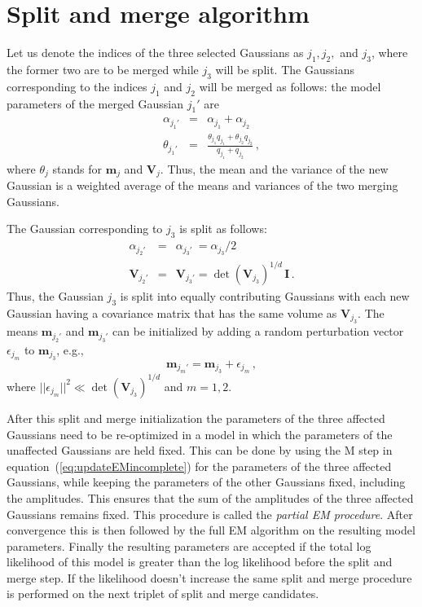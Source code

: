 \documentclass[aoas,preprint,authoryear,round]{imsart}
\newcommand{\eqnnumber}{equation}
\newcommand{\eg}{e.g.}
\renewcommand{\vec}[1]{\mathbf{#1}} %
\newcommand{\mm}{\vec{m}}
\newcommand{\mmj}{\mm_j}
\newcommand{\ten}[1]{\mathbf{#1}} %
\newcommand{\VV}{\ten{V}}
\newcommand{\II}{\ten{I}}
\newcommand{\VVj}{\VV_{\!j}} %
\newcommand{\norm}{|\!|}
\begin{document}
\section{Split and merge algorithm}\label{sec:splitmergeappendix}

Let us denote the indices of the three selected Gaussians as $j_1,
j_2,$ and $j_3$, where the former two are to be merged while $j_3$
will be split. The Gaussians corresponding to the indices $j_1$ and
$j_2$ will be merged as follows: the model parameters of the merged
Gaussian $j_1'$ are
\begin{eqnarray}\displaystyle\label{merged}
\alpha_{j_1'} &=& \alpha_{j_1} + \alpha_{j_2}\nonumber\\ \theta_{j_1'}
&=& \frac{\theta_{j_1}q_{j_1} + \theta_{j_2}q_{j_2}}{q_{j_1} + q_{j_2}}\, ,
\end{eqnarray}
where $\theta_j$ stands for $\mmj$ and $\VVj$. Thus, the mean and the
variance of the new Gaussian is a weighted average of the means and variances of the two
merging Gaussians.


The Gaussian corresponding to $j_3$ is split as follows:
\begin{eqnarray}\displaystyle\label{split}
\alpha_{j_2'} &=& \alpha_{j_3'}\ = \alpha_{j_3}/2\nonumber\\
\VV_{j_2'}&=&\VV_{j_3'} = \det(\VV_{j_3})^{1/d}\,\II\, .
\end{eqnarray}
Thus, the Gaussian $j_3$ is split into equally contributing Gaussians
with each new Gaussian having a covariance matrix that has the same
volume as $\VV_{j_3}$. The means $\mm_{j_2'}$ and $\mm_{j_3'}$ can be
initialized by adding a random perturbation vector $\epsilon_{j_m}$ to
$\mm_{j_3}$, \eg,
\begin{equation}\label{split2}
\mm_{j_m'} = \mm_{j_3} + \epsilon_{j_m}\, ,
\end{equation}
where $\norm\epsilon_{j_m}\norm^2 \ll \det(\VV_{j_3})^{1/d}$ and
$m=1,2$.

After this split and merge initialization the parameters of the three
affected Gaussians need to be re-optimized in a model in which the
parameters of the unaffected Gaussians are held fixed. This can be
done by using the M step in \eqnnumber\ (\ref{eq:updateEMincomplete})
for the parameters of the three affected Gaussians, while keeping the
parameters of the other Gaussians fixed, including the
amplitudes. This ensures that the sum of the amplitudes of the three
affected Gaussians remains fixed. This procedure is called the {\it
partial EM procedure}. After convergence this is then followed by the
full EM algorithm on the resulting model parameters. Finally the
resulting parameters are accepted if the total log likelihood of this
model is greater than the log likelihood before the split and merge
step. If the likelihood doesn't increase the same split and merge
procedure is performed on the next triplet of split and merge
candidates.
\end{document}
